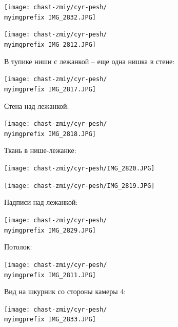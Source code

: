 \begin{center}
\texttt{[image: chast-zmiy/cyr-pesh/\\myimgprefix IMG\_2832.JPG]}
\end{center}

\begin{center}
\texttt{[image: chast-zmiy/cyr-pesh/\\myimgprefix IMG\_2812.JPG]}
\end{center}

\newpage

В тупике ниши с лежанкой – еще одна нишка в стене:

\begin{center}
\texttt{[image: chast-zmiy/cyr-pesh/\\myimgprefix IMG\_2817.JPG]}
\end{center}

Стена над лежанкой:

\begin{center}
\texttt{[image: chast-zmiy/cyr-pesh/\\myimgprefix IMG\_2818.JPG]}
\end{center}

\newpage

Ткань в нише-лежанке:

\begin{center}
\texttt{[image: chast-zmiy/cyr-pesh/IMG\_2820.JPG]}
\end{center}

\begin{center}
\texttt{[image: chast-zmiy/cyr-pesh/IMG\_2819.JPG]}
\end{center}

\newpage

Надписи над лежанкой:

\begin{center}
\texttt{[image: chast-zmiy/cyr-pesh/\\myimgprefix IMG\_2829.JPG]}
\end{center}

Потолок:

\begin{center}
\texttt{[image: chast-zmiy/cyr-pesh/\\myimgprefix IMG\_2811.JPG]}
\end{center}

\newpage

Вид на шкурник со стороны камеры 4:

\begin{center}
\texttt{[image: chast-zmiy/cyr-pesh/\\myimgprefix IMG\_2833.JPG]}
\end{center}

